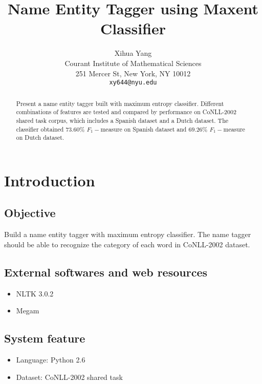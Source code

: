 \documentclass[10pt,twocolumn,letterpaper]{article}
\begin{document}
\title{Name Entity Tagger using Maxent Classifier}

\author{Xihua Yang\\
Courant Institute of Mathematical Sciences\\
251 Mercer St, New York, NY 10012\\
{\tt\small xy644@nyu.edu}
}

\maketitle
\lstset{basicstyle=\ttfamily,
  breaklines=true}
\begin{abstract}
Present a name entity tagger built with maximum entropy classifier. Different combinations of features are tested and compared by performance on CoNLL-2002\cite{CoNLL} shared task corpus, which includes a Spanish dataset and a Dutch dataset. The classifier obtained $73.60\%$ $F_1-$measure on Spanish dataset and $69.26\%$ $F_1-$measure on Dutch dataset.
\end{abstract}

\section{Introduction}

\subsection{Objective}
Build a name entity tagger with maximum entropy classifier. The name tagger should be able to recognize the category of each word in CoNLL-2002 dataset.

\subsection{External softwares and web resources}
\begin{itemize}
   \item NLTK 3.0.2\cite{BirdKleinLoper09}
   \item Megam\cite{Megam}
\end{itemize}

\subsection{System feature}
\begin{itemize}
   \item Language: Python 2.6
   \item Dataset: CoNLL-2002 shared task
\end{itemize}
\end{document}
